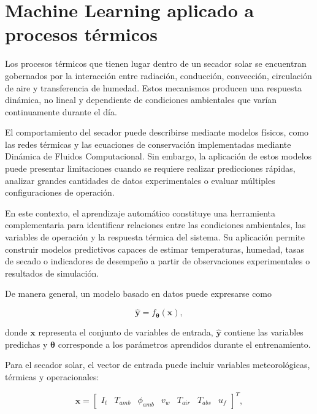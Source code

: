 \section{Machine Learning aplicado a procesos térmicos}
\label{sec:ml_procesos_termicos}

Los procesos térmicos que tienen lugar dentro de un secador solar se encuentran gobernados por la interacción entre radiación, conducción, convección, circulación de aire y transferencia de humedad. Estos mecanismos producen una respuesta dinámica, no lineal y dependiente de condiciones ambientales que varían continuamente durante el día.

El comportamiento del secador puede describirse mediante modelos físicos, como las redes térmicas y las ecuaciones de conservación implementadas mediante Dinámica de Fluidos Computacional. Sin embargo, la aplicación de estos modelos puede presentar limitaciones cuando se requiere realizar predicciones rápidas, analizar grandes cantidades de datos experimentales o evaluar múltiples configuraciones de operación.

En este contexto, el aprendizaje automático constituye una herramienta complementaria para identificar relaciones entre las condiciones ambientales, las variables de operación y la respuesta térmica del sistema. Su aplicación permite construir modelos predictivos capaces de estimar temperaturas, humedad, tasas de secado o indicadores de desempeño a partir de observaciones experimentales o resultados de simulación.

De manera general, un modelo basado en datos puede expresarse como

\begin{equation}
\hat{\mathbf{y}}
=
f_{\boldsymbol{\theta}}
\left(
\mathbf{x}
\right),
\label{eq:ml_general}
\end{equation}

donde $\mathbf{x}$ representa el conjunto de variables de entrada, $\hat{\mathbf{y}}$ contiene las variables predichas y $\boldsymbol{\theta}$ corresponde a los parámetros aprendidos durante el entrenamiento.

Para el secador solar, el vector de entrada puede incluir variables meteorológicas, térmicas y operacionales:

\begin{equation}
\mathbf{x}
=
\begin{bmatrix}
I_t &
T_{amb} &
\phi_{amb} &
v_w &
T_{air} &
T_{abs} &
u_f
\end{bmatrix}^{T},
\end{equation}

